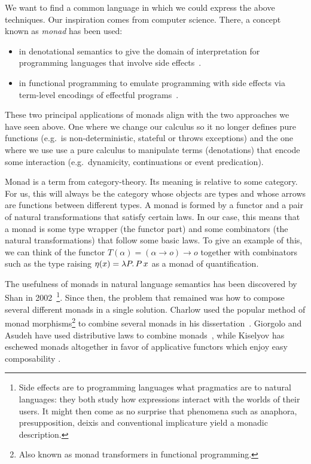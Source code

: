 \documentclass{llncs}
\begin{document}
We want to find a common language in which we could express the above
techniques. Our inspiration comes from computer science. There, a concept
known as \emph{monad} has been used:
\begin{itemize}
\item in denotational semantics to give the domain of interpretation for
  programming languages that involve side effects~\cite{moggi1991notions}.
\item in functional programming to emulate programming with side effects
  via term-level encodings of effectful programs~\cite{wadler1992essence}.
\end{itemize}
These two principal applications of monads align with the two approaches we
have seen above. One where we change our calculus so it no longer defines
pure functions (e.g.\ is non-deterministic, stateful or throws exceptions)
and the one where we use use a pure calculus to manipulate terms
(denotations) that encode some interaction (e.g.\ dynamicity, continuations
or event predication).

Monad is a term from category-theory. Its meaning is relative to some
category. For us, this will always be the category whose objects are types
and whose arrows are functions between different types. A monad is formed
by a functor and a pair of natural transformations that satisfy certain
laws. In our case, this means that a monad is some type wrapper (the
functor part) and some combinators (the natural transformations) that
follow some basic laws. To give an example of this, we can think of the
functor $T(\alpha) = (\alpha \to o) \to o$ together with combinators such
as the type raising $\eta(x) = \lambda P.\, P\,x$ as a monad of
quantification.

The usefulness of monads in natural language semantics has been discovered
by Shan in 2002~\cite{shan2002monads}\footnote{Side effects are to
  programming languages what pragmatics are to natural languages: they both
  study how expressions interact with the worlds of their users. It might
  then come as no surprise that phenomena such as anaphora, presupposition,
  deixis and conventional implicature yield a monadic description.}. Since
then, the problem that remained was how to compose several different monads
in a single solution. Charlow used the popular method of monad
morphisms\footnote{Also known as monad transformers in functional
  programming.} to combine several monads in his
dissertation~\cite{charlow2014semantics}. Giorgolo and Asudeh have used
distributive laws to combine monads~\cite{giorgolo2015natural}, while
Kiselyov has eschewed monads altogether in favor of applicative functors
which enjoy easy composability \cite{kiselyov2015applicative}.
\end{document}
